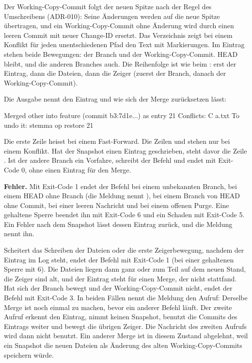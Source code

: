 Der Working-Copy-Commit folgt der neuen Spitze nach der Regel des Umschreibens (ADR-010):
Seine Änderungen werden auf die neue Spitze übertragen, und ein Working-Copy-Commit ohne Änderung
wird durch einen leeren Commit mit neuer Change-ID ersetzt.
Das Verzeichnis zeigt bei einem Konflikt für jeden unentschiedenen Pfad den Text mit Markierungen.
Im Eintrag  stehen beide Bewegungen: der Branch und der Working-Copy-Commit.
HEAD bleibt, und die anderen Branches auch.
Die Reihenfolge ist wie beim : erst der Eintrag, dann die Dateien,
dann die Zeiger (zuerst der Branch, danach der Working-Copy-Commit).

Die Ausgabe nennt den Eintrag und wie sich der Merge zurücksetzen lässt:

\starttyping
Merged other into feature (commit b3:7d1e...) as entry 21
Conflicts:
C a.txt
To undo it: stemma op restore 21
\stoptyping

Die erste Zeile heisst  bei einem Fast-Forward.
Die Zeilen  und  stehen nur bei einem Konflikt.
Hat der Snapshot einen Eintrag geschrieben, steht davor die Zeile
.
Ist der andere Branch ein Vorfahre, schreibt der Befehl 
und endet mit Exit-Code 0, ohne einen Eintrag für den Merge.

{\bf Fehler.} Mit Exit-Code 1 endet der Befehl bei einem unbekannten Branch, bei einem HEAD ohne
Branch (die Meldung nennt ), bei einem Branch von HEAD ohne Commit,
bei einer leeren Nachricht und bei einem offenen Purge.
Eine gehaltene Sperre beendet ihn mit Exit-Code 6 und ein Schaden mit Exit-Code 5.
Ein Fehler nach dem Snapshot lässt dessen Eintrag zurück, und die Meldung nennt ihn.

Scheitert das Schreiben der Dateien oder die erste Zeigerbewegung, nachdem der Eintrag im Log
steht, endet der Befehl mit Exit-Code 1 (bei einer gehaltenen Sperre mit 6).
Die Dateien liegen dann ganz oder zum Teil auf dem neuen Stand, die Zeiger sind alt,
und der Eintrag steht für einen Merge, der nicht stattfand.
Hat sich der Branch bewegt und der Working-Copy-Commit nicht, endet der Befehl mit Exit-Code 3.
In beiden Fällen nennt die Meldung den Aufruf: Derselbe Merge ist noch einmal zu machen,
bevor ein anderer Befehl läuft. Der zweite Aufruf erkennt den Eintrag, nimmt keinen Snapshot,
benutzt die Commits des Eintrags weiter und bewegt die übrigen Zeiger.
Die Nachricht des zweiten Aufrufs wird dann nicht benutzt.
Ein anderer Merge ist in diesem Zustand abgelehnt, weil ein Snapshot die neuen Dateien als
Änderung des alten Working-Copy-Commits speichern würde.


